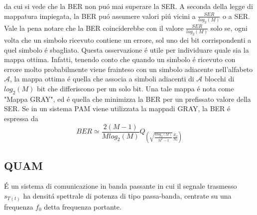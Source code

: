             da cui si vede che la BER non puó mai superare la SER. A seconda della legge di mappatura impiegata,
            la BER puó assumere valori piú vicini a $\frac{SER}{log_2(M)}$ o a SER. Vale la pena notare che la BER 
            coinciderebbe con il valore $\frac{SER}{log_2(M)}$ solo se, ogni volta che un simbolo ricevuto contiene 
            un errore, sol uno dei bit corrispondenti a quel simbolo é sbagliato. Questa osservazione é utile 
            per individuare quale sia la mappa ottima. Infatti, tenendo conto che quando un simbolo é ricevuto con errore
            molto probabilmente viene frainteso con un simbolo adiacente nell'alfabeto $\mathcal{A}$, la mappa ottima é 
            quella che associa a simboli adiacenti di $\mathcal{A}$ blocchi di $log_2(M)$ bit che differiscono per un solo bit. 
            Una tale mappa é nota come "Mappa GRAY", ed é quella che minimizza la BER per un prefissato valore della SER. 
            Se in un sistema PAM viene utilizzata la mappadi GRAY, la BER é espressa da 
            \[
                BER \simeq \frac{2(M-1)}{Mlog_2(M)}Q_{\displaystyle \left(\sqrt{\frac{6log_2(M)}{M^2-1}}\frac{E_d}{N_0}\right)}    
            \] 
    \subsection{QUAM}
        É un sistema di comunicazione in {\color{red}banda passante} in cui il segnale trasmesso $s_{T(t)}$ ha densitá 
        spettrale di potenza di tipo passa-banda, centrate su una frequenza $f_0$ detta frequenza portante.
